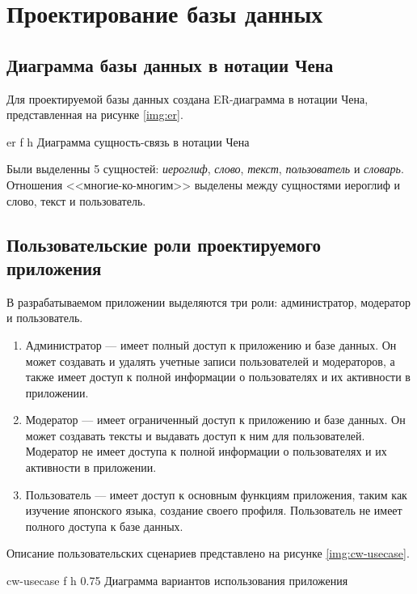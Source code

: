 \clearpage

\section{Проектирование базы данных}

\subsection{Диаграмма базы данных в нотации Чена}

Для проектируемой базы данных создана ER-диаграмма в нотации Чена, представленная на рисунке \ref{img:er}.

  {er}
  {f}
  {h}
  {\linewidth}
  {Диаграмма сущность-связь в нотации Чена}

Были выделенны 5 сущностей: \textit{иероглиф}, \textit{слово}, \textit{текст}, \textit{пользователь} и \textit{словарь}. Отношения <<многие-ко-многим>> выделены между сущностями иероглиф и слово, текст и пользователь.

\subsection{Пользовательские роли проектируемого приложения}

В разрабатываемом приложении выделяются три роли: администратор,
модератор и пользователь.

\begin{enumerate}
  \item Администратор --- имеет полный
    доступ к приложению и базе данных. Он может создавать и 
    удалять учетные записи пользователей и модераторов, а также имеет доступ к полной информации о пользователях и их активности в приложении.
  \item Модератор --- имеет ограниченный 
    доступ к приложению и базе данных. Он может создавать тексты и
    выдавать доступ к ним для пользователей. Модератор не имеет доступа к полной информации о пользователях и их активности в приложении.
  \item Пользователь --- имеет 
    доступ к основным функциям приложения, таким как изучение 
    японского языка, создание своего профиля. Пользователь не имеет полного доступа к базе данных.
\end{enumerate}

Описание пользовательских сценариев представлено на рисунке \ref{img:cw-usecase}.

  {cw-usecase}
  {f}
  {h}
  {0.75\linewidth}
  {Диаграмма вариантов использования приложения}

